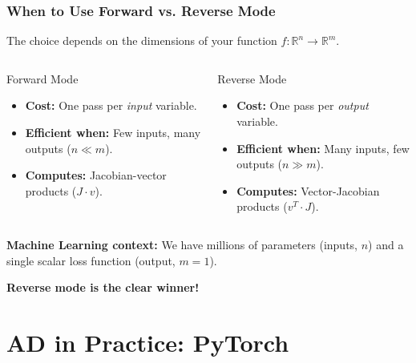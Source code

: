 \documentclass[notes]{beamer}
\begin{document}
\begin{frame}
\frametitle{When to Use Forward vs. Reverse Mode}

The choice depends on the dimensions of your function $f: \mathbb{R}^n \to \mathbb{R}^m$.

\begin{columns}[T]
    \begin{column}{0.48\textwidth}
        \begin{block}{Forward Mode}
        \begin{itemize}
            \item \textbf{Cost:} One pass per \textit{input} variable.
            \item \textbf{Efficient when:} Few inputs, many outputs ($n \ll m$).
            \item \textbf{Computes:} Jacobian-vector products ($J \cdot v$).
        \end{itemize}
        \end{block}
    \end{column}
    \hfill
    \begin{column}{0.48\textwidth}
        \begin{block}{Reverse Mode}
        \begin{itemize}
            \item \textbf{Cost:} One pass per \textit{output} variable.
            \item \textbf{Efficient when:} Many inputs, few outputs ($n \gg m$).
            \item \textbf{Computes:} Vector-Jacobian products ($v^T \cdot J$).
        \end{itemize}
        \end{block}
    \end{column}
\end{columns}

\vspace{1cm}

\textbf{Machine Learning context:} We have millions of parameters (inputs, $n$) and a single scalar loss function (output, $m=1$).
\begin{center}
\textbf{Reverse mode is the clear winner!}
\end{center}

\end{frame}

\section{AD in Practice: PyTorch}
\end{document}
